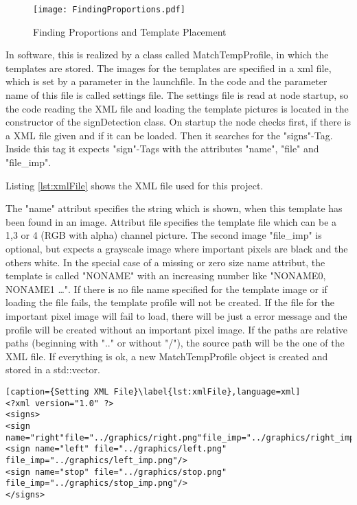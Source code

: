 \begin{figure}[H]
\begin{center}
  \texttt{[image: FindingProportions.pdf]}
  \caption{Finding Proportions and Template Placement}
  \label{figure:findPropTempPlace}
\end{center}
\end{figure} 

In software, this is realized by a class called MatchTempProfile, in which the templates are stored.
The images for the templates are specified in a xml file, which is set by a parameter in the launchfile.
\newpage 
In the code and the parameter name of this file is called settings file. The settings file is read at node startup,
so the code reading the XML file and loading the template pictures is located in the constructor of the
signDetection class. On startup the node checks first, if there is a XML file given and if it can be loaded. 
Then it searches for the "signs"-Tag. Inside this tag it expects "sign"-Tags 
with the attributes "name", "file" and "file\_imp".

Listing \vref{lst:xmlFile} shows the XML file used for this project.

The "name" attribut specifies the string which is shown, when this template has been found in an image.
Attribut file specifies the template file which can be a 1,3 or 4 (RGB with alpha) channel picture. 
The second image "file\_imp" is optional, but expects a grayscale image where important pixels are black and the others 
white. In the special case of a missing or zero size name attribut, the template is called "NONAME" with an increasing number
like "NONAME0, NONAME1 \ldots". If there is no file name specified for the template image or if loading the file
fails, the template profile will not be created. If the file for the important pixel image will fail to load, there will
be just a error message and the profile will be created without an important pixel image. If the paths are relative paths
(beginning with ".." or without "/"), the source path will be the one of the XML file. If everything is ok, a new 
MatchTempProfile object is created and stored in a std::vector.

\begin{lstlisting}[caption={Setting XML File}\label{lst:xmlFile},language=xml]
<?xml version="1.0" ?>
<signs>
<sign name="right"file="../graphics/right.png"file_imp="../graphics/right_imp.png"/>
<sign name="left" file="../graphics/left.png" file_imp="../graphics/left_imp.png"/>
<sign name="stop" file="../graphics/stop.png" file_imp="../graphics/stop_imp.png"/>
</signs>
  
\end{lstlisting}

